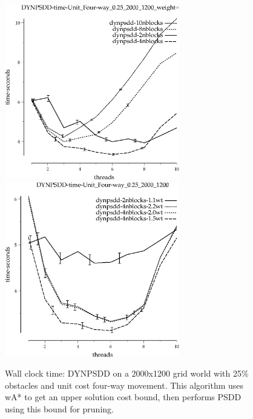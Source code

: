 \documentclass{article}
\begin{document}
\begin{figure}[t]
\begin{center}
\includegraphics[width=3in]{grid_unit_four-way_0.25_2000_1200/DYNPSDD-time-Unit_Four-way_0.25_2000_1200_weight=2.2.eps}
\includegraphics[width=3in]{grid_unit_four-way_0.25_2000_1200/DYNPSDD-time-Unit_Four-way_0.25_2000_1200.eps}
\caption{Wall clock time: DYNPSDD on a 2000x1200 grid world with 25\%
  obstacles and unit cost four-way movement.  This algorithm uses wA*
  to get an upper solution cost bound, then performs PSDD using this
  bound for pruning.}
\end{center}
\end{figure}
\end{document}
